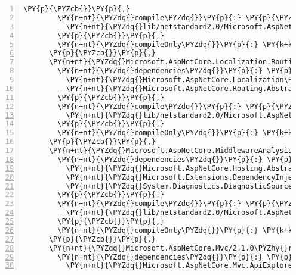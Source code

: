 \begin{Verbatim}[commandchars=\\\{\},numbers=left,firstnumber=1,stepnumber=1,numberblanklines=0]
        \PY{p}{\PYZcb{}}\PY{p}{,}
        \PY{n+nt}{\PYZdq{}compile\PYZdq{}}\PY{p}{:} \PY{p}{\PYZob{}}
          \PY{n+nt}{\PYZdq{}lib/netstandard2.0/Microsoft.AspNetCore.Localization.dll\PYZdq{}}\PY{p}{:} \PY{p}{\PYZob{}}\PY{p}{\PYZcb{}}
        \PY{p}{\PYZcb{}}\PY{p}{,}
        \PY{n+nt}{\PYZdq{}compileOnly\PYZdq{}}\PY{p}{:} \PY{k+kc}{true}
      \PY{p}{\PYZcb{}}\PY{p}{,}
      \PY{n+nt}{\PYZdq{}Microsoft.AspNetCore.Localization.Routing/2.1.0\PYZhy{}rc1\PYZhy{}final\PYZdq{}}\PY{p}{:} \PY{p}{\PYZob{}}
        \PY{n+nt}{\PYZdq{}dependencies\PYZdq{}}\PY{p}{:} \PY{p}{\PYZob{}}
          \PY{n+nt}{\PYZdq{}Microsoft.AspNetCore.Localization\PYZdq{}}\PY{p}{:} \PY{l+s+s2}{\PYZdq{}2.1.0\PYZhy{}rc1\PYZhy{}final\PYZdq{}}\PY{p}{,}
          \PY{n+nt}{\PYZdq{}Microsoft.AspNetCore.Routing.Abstractions\PYZdq{}}\PY{p}{:} \PY{l+s+s2}{\PYZdq{}2.1.0\PYZhy{}rc1\PYZhy{}final\PYZdq{}}
        \PY{p}{\PYZcb{}}\PY{p}{,}
        \PY{n+nt}{\PYZdq{}compile\PYZdq{}}\PY{p}{:} \PY{p}{\PYZob{}}
          \PY{n+nt}{\PYZdq{}lib/netstandard2.0/Microsoft.AspNetCore.Localization.Routing.dll\PYZdq{}}\PY{p}{:} \PY{p}{\PYZob{}}\PY{p}{\PYZcb{}}
        \PY{p}{\PYZcb{}}\PY{p}{,}
        \PY{n+nt}{\PYZdq{}compileOnly\PYZdq{}}\PY{p}{:} \PY{k+kc}{true}
      \PY{p}{\PYZcb{}}\PY{p}{,}
      \PY{n+nt}{\PYZdq{}Microsoft.AspNetCore.MiddlewareAnalysis/2.1.0\PYZhy{}rc1\PYZhy{}final\PYZdq{}}\PY{p}{:} \PY{p}{\PYZob{}}
        \PY{n+nt}{\PYZdq{}dependencies\PYZdq{}}\PY{p}{:} \PY{p}{\PYZob{}}
          \PY{n+nt}{\PYZdq{}Microsoft.AspNetCore.Hosting.Abstractions\PYZdq{}}\PY{p}{:} \PY{l+s+s2}{\PYZdq{}2.1.0\PYZhy{}rc1\PYZhy{}final\PYZdq{}}\PY{p}{,}
          \PY{n+nt}{\PYZdq{}Microsoft.Extensions.DependencyInjection.Abstractions\PYZdq{}}\PY{p}{:} \PY{l+s+s2}{\PYZdq{}2.1.0\PYZhy{}rc1\PYZhy{}final\PYZdq{}}\PY{p}{,}
          \PY{n+nt}{\PYZdq{}System.Diagnostics.DiagnosticSource\PYZdq{}}\PY{p}{:} \PY{l+s+s2}{\PYZdq{}4.5.0\PYZhy{}rc1\PYZdq{}}
        \PY{p}{\PYZcb{}}\PY{p}{,}
        \PY{n+nt}{\PYZdq{}compile\PYZdq{}}\PY{p}{:} \PY{p}{\PYZob{}}
          \PY{n+nt}{\PYZdq{}lib/netstandard2.0/Microsoft.AspNetCore.MiddlewareAnalysis.dll\PYZdq{}}\PY{p}{:} \PY{p}{\PYZob{}}\PY{p}{\PYZcb{}}
        \PY{p}{\PYZcb{}}\PY{p}{,}
        \PY{n+nt}{\PYZdq{}compileOnly\PYZdq{}}\PY{p}{:} \PY{k+kc}{true}
      \PY{p}{\PYZcb{}}\PY{p}{,}
      \PY{n+nt}{\PYZdq{}Microsoft.AspNetCore.Mvc/2.1.0\PYZhy{}rc1\PYZhy{}final\PYZdq{}}\PY{p}{:} \PY{p}{\PYZob{}}
        \PY{n+nt}{\PYZdq{}dependencies\PYZdq{}}\PY{p}{:} \PY{p}{\PYZob{}}
          \PY{n+nt}{\PYZdq{}Microsoft.AspNetCore.Mvc.ApiExplorer\PYZdq{}}\PY{p}{:} \PY{l+s+s2}{\PYZdq{}2.1.0\PYZhy{}rc1\PYZhy{}final\PYZdq{}}\PY{p}{,}

\end{Verbatim}
